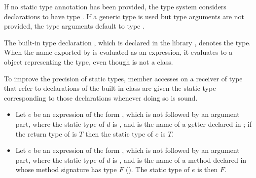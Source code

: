 \documentclass[makeidx]{article}
\begin{document}
{\LMHash{}%
If no static type annotation has been provided,
the type system considers declarations to have type \DYNAMIC{}.
If a generic type is used but type arguments are not provided,
the type arguments default to type \DYNAMIC{}.


\LMHash{}%
The built-in type declaration ,
which is declared in the library ,
denotes the \DYNAMIC{} type.
When the name \DYNAMIC{} exported by  is evaluated as an expression,
it evaluates to a  object representing the \DYNAMIC{} type,
even though \DYNAMIC{} is not a class.


\LMHash{}%
To improve the precision of static types,
member accesses on a receiver of type \DYNAMIC{} that refer to
declarations of the built-in class 
are given the static type corresponding to those declarations
whenever doing so is sound.

\begin{itemize}
\item
  Let $e$ be an expression of the form , which is not followed by an
  argument part, where the static type of $d$ is \DYNAMIC, and \id{} is the name of a
  getter declared in ; if the return type of  is $T$
  then the static type of $e$ is $T$.

\item
  Let $e$ be an expression of the form , which is not followed by an
  argument part, where the static type of $d$ is \DYNAMIC, and \id{} is the name of a
  method declared in  whose method signature has type $F$
  (). The static type of $e$ is then $F$.


\end{itemize}}
\end{document}
